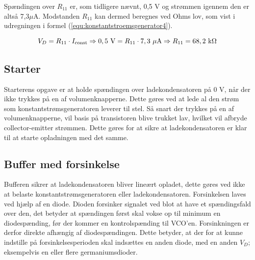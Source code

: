 Spændingen over $R_{11}$ er, som tidligere nævnt, 0,5 V og strømmen igennem den er altså 7,3$\mu$A. Modstanden $R_11$ kan dermed beregnes ved Ohms lov, som vist i udregningen i formel (\ref{equ:konstantstroemsgenerator4}).

\begin{equation}
\label{equ:konstantstroemsgenerator4}
V_D = R_{11} \cdot I_{\mathrm{const}} \Rightarrow \mathrm{0,5~V} = R_{11} \cdot \mathrm{7,3~\mu A} \Rightarrow R_{11} = \mathrm{68,2~k\ohm}
\end{equation}

\subsection*{Starter}
\label{volumenkontrol-design-starter}

Starterens opgave er at holde spændingen over ladekondensatoren på 0 V, når der ikke trykkes på en af volumenknapperne. Dette gøres ved at lede al den strøm som konstantstrømsgeneratoren leverer til stel. Så snart der trykkes på en af volumenknapperne, vil basis på transistoren blive trukket lav, hvilket vil afbryde collector-emitter strømmen. Dette gøres for at sikre at ladekondensatoren er klar til at starte opladningen med det samme.
\subsection*{Buffer med forsinkelse}
\label{volumenkontrol-design-buffer}

Bufferen sikrer at ladekondensatoren bliver lineært opladet, dette gøres ved ikke at belaste konstantstrømsgeneratoren eller ladekondensatoren. Forsinkelsen laves ved hjælp af en diode. Dioden forsinker signalet ved blot at have et spændingsfald over den, det betyder at spændingen først skal vokse op til minimum en diodespænding, før der kommer en kontrolspænding til VCO'en. Forsinkningen er derfor direkte afhængig af diodespændingen. Dette betyder, at der for at kunne indstille på forsinkelsesperioden skal indsættes en anden diode, med en anden $V_{D}$; eksempelvis en eller flere germaniumsdioder.
